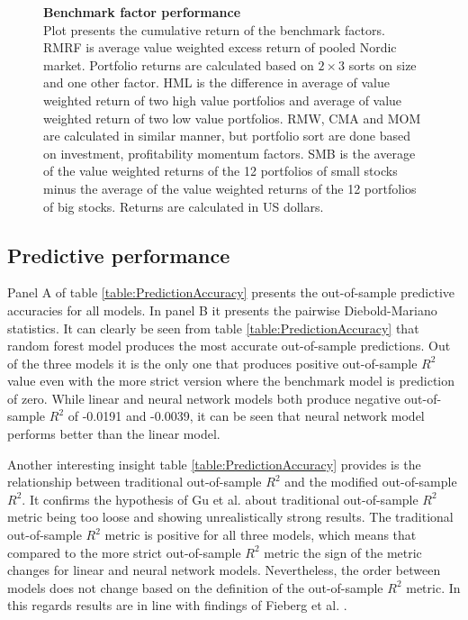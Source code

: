 \documentclass{article}
\begin{document}
\begin{figure}[h]
\centering
\caption[Benchmark factor performance]{\textbf{Benchmark factor performance}\\ Plot presents the cumulative return of the benchmark factors. RMRF is average value weighted excess return of pooled Nordic market. Portfolio returns are calculated based on $2 \times 3$ sorts on size and one other factor. HML is the difference in average of value weighted return of two high value portfolios and average of value weighted return of two low value portfolios. RMW, CMA and MOM are calculated in similar manner, but portfolio sort are done based on investment, profitability momentum factors. SMB is the average of the value weighted returns of the 12 portfolios of small stocks minus the average of the value weighted returns of the 12 portfolios of big stocks. Returns are calculated in US dollars.}

\label{plot:factor_performance}
\end{figure}

\subsection{Predictive performance}\label{PredictivePerformance}

Panel A of table \ref{table:PredictionAccuracy} presents the out-of-sample predictive accuracies for all models. In panel B it presents the pairwise Diebold-Mariano statistics. It can clearly be seen from table \ref{table:PredictionAccuracy} that random forest model produces the most accurate out-of-sample predictions. Out of the three models it is the only one that produces positive out-of-sample $R^2$ value even with the more strict version where the benchmark model is prediction of zero. While linear and neural network models both produce negative out-of-sample $R^2$ of -0.0191 and -0.0039, it can be seen that neural network model performs better than the linear model. 

Another interesting insight table \ref{table:PredictionAccuracy} provides is the relationship between traditional out-of-sample $R^2$ and the modified out-of-sample $R^2$. It confirms the hypothesis of Gu et al. \citeyear{guetal} about traditional out-of-sample $R^2$ metric being too loose and showing unrealistically strong results. The  traditional out-of-sample $R^2$ metric is positive for all three models, which means that compared to the more strict out-of-sample $R^2$ metric the sign of the metric changes for linear and neural network models. Nevertheless, the order between models does not change based on the definition of the out-of-sample $R^2$ metric. In this regards results are in line with findings of Fieberg et al. \citeyear{Fieberg}.
\end{document}

